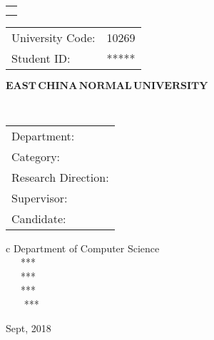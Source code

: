 

\pagestyle{empty}

\begin{flushleft}
	\large
	\renewcommand\arraystretch{1.5}
	\begin{tabular}{l}
		\noindent{\large Dissertation for master degree in 2019}  \\ 
		\noindent{\large  (Professional)}\\ 
	\end{tabular}
\qquad
	\begin{tabular}{lc}
	 University Code:  &  10269  \\ 
 Student ID: &    *****  \\ 
	\end{tabular}
\end{flushleft}

\vskip 2cm

\begin{center}
{\Huge $\mathbf{EAST}\,\mathbf{CHINA}\,\mathbf{NORMAL}\,
\mathbf{UNIVERSITY}$}
\end{center}

\vskip 3cm

\begin{center}
\bfseries{\scshape{\huge \TheisNameEn
}}\\
\end{center}

\vskip 3.5cm {\large
\begin{center}
\begin{tabular}{l}
Department:\\
Category:\\ 
Research Direction:\\
Supervisor:\\
Candidate:
\end{tabular}
\begin{tabular}c
\quad Department of Computer Science \quad\\
\hline ~~~{***}  \\
\hline ~~~{***}\\
\hline ~~~{***}\\
\hline ~~~ {***}\\
\hline
\end{tabular}
\end{center}}

\vskip 30mm

\begin{center}
{\Large Sept, 2018}
\end{center}
